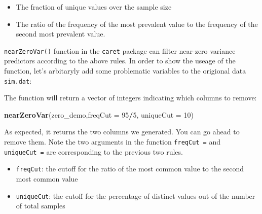 \documentclass[
]{article}
\newenvironment{Shaded}{\begin{snugshade}}{\end{snugshade}}
\newcommand{\CommentTok}[1]{\textcolor[rgb]{0.56,0.35,0.01}{\textit{#1}}}
\newcommand{\DataTypeTok}[1]{\textcolor[rgb]{0.13,0.29,0.53}{#1}}
\newcommand{\DecValTok}[1]{\textcolor[rgb]{0.00,0.00,0.81}{#1}}
\newcommand{\KeywordTok}[1]{\textcolor[rgb]{0.13,0.29,0.53}{\textbf{#1}}}
\newcommand{\NormalTok}[1]{#1}
\newcommand{\OperatorTok}[1]{\textcolor[rgb]{0.81,0.36,0.00}{\textbf{#1}}}
\providecommand{\tightlist}{%
  \setlength{\itemsep}{0pt}\setlength{\parskip}{0pt}}
\begin{document}
\begin{itemize}
\tightlist
\item
  The fraction of unique values over the sample size
\item
  The ratio of the frequency of the most prevalent value to the
  frequency of the second most prevalent value.
\end{itemize}

\texttt{nearZeroVar()} function in the \texttt{caret} package can filter
near-zero variance predictors according to the above rules. In order to
show the useage of the function, let's arbitaryly add some problematic
variables to the origional data \texttt{sim.dat}:

\begin{Shaded}
\end{Shaded}

The function will return a vector of integers indicating which columns
to remove:

\begin{Shaded}
\begin{Highlighting}[]
\KeywordTok{nearZeroVar}\NormalTok{(zero_demo,}\DataTypeTok{freqCut =} \DecValTok{95}\OperatorTok{/}\DecValTok{5}\NormalTok{, }\DataTypeTok{uniqueCut =} \DecValTok{10}\NormalTok{)}
\end{Highlighting}
\end{Shaded}

As expected, it returns the two columns we generated. You can go ahead
to remove them. Note the two arguments in the function
\texttt{freqCut\ =} and \texttt{uniqueCut\ =} are corresponding to the
previous two rules.

\begin{itemize}
\tightlist
\item
  \texttt{freqCut}: the cutoff for the ratio of the most common value to
  the second most common value
\item
  \texttt{uniqueCut}: the cutoff for the percentage of distinct values
  out of the number of total samples
\end{itemize}
\end{document}
